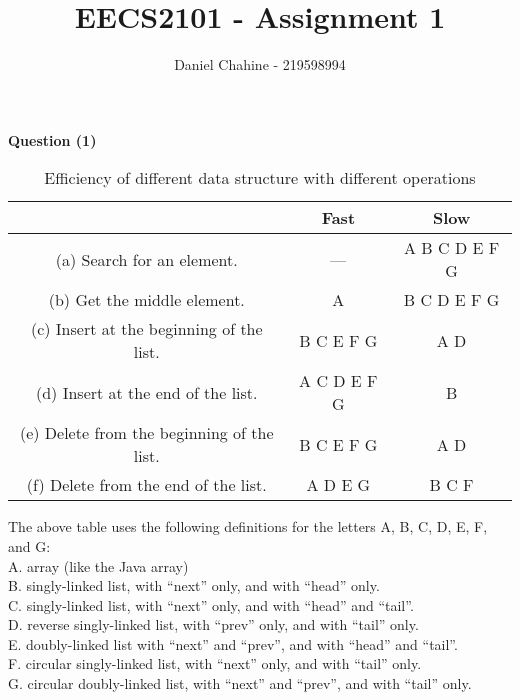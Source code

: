 \documentclass{article}
\title{EECS2101 - Assignment 1}
\author{Daniel Chahine - 219598994}
\begin{document}
\maketitle

\begin{large}
\textbf{Question (1)}
\end{large}


\begin{table}[h!]
\setlength{\tabcolsep}{25pt}
\renewcommand{\arraystretch}{1.5}
\centering
\begin{tabular}{ ||c|c|c||  }
 \hline
  & \textbf{Fast} & \textbf{Slow}\\ 
 \hline
 (a) Search for an element. & --- & A B C D E F G   \\\hline 
 (b) Get the middle element. & A & B C D E F G  \\\hline
 (c) Insert at the beginning of the list. & B C E F G & A D\\\hline
 (d) Insert at the end of the list. & A C D E F G  &B \\\hline
 (e) Delete from the beginning of the list. & B C E F G & A D \\\hline 
 (f) Delete from the end of the list. & A D E G & B C F \\
 
\hline
\end{tabular}
\caption{Efficiency of different data structure with different operations}
\label{table:1}
\end{table}

The above table uses the following definitions for the letters A, B, C, D, E, F, and G:\\
A. array (like the Java array)\\
B. singly-linked list, with “next” only, and with “head” only.\\
C. singly-linked list, with “next” only, and with “head” and “tail”.\\
D. reverse singly-linked list, with “prev” only, and with “tail” only.\\
E. doubly-linked list with “next” and “prev”, and with “head” and “tail”.\\
F. circular singly-linked list, with “next” only, and with “tail” only.\\
G. circular doubly-linked list, with “next” and “prev”, and with “tail” only.\\
\end{document}

